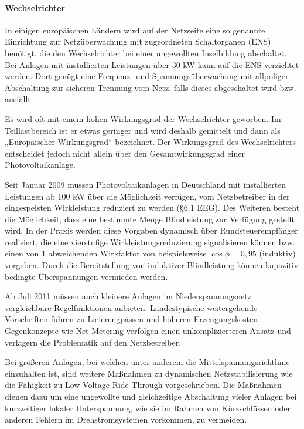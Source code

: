 \paragraph{Wechselrichter}
In einigen europäischen Ländern wird auf der Netzseite eine so genannte Einrichtung zur Netzüberwachung mit zugeordneten Schaltorganen (ENS) benötigt, die den Wechselrichter bei einer ungewollten Inselbildung abschaltet. Bei Anlagen mit installierten Leistungen über 30 \si{kW} kann auf die ENS verzichtet werden. Dort genügt eine Frequenz- und Spannungsüberwachung mit allpoliger Abschaltung zur sicheren Trennung vom Netz, falls dieses abgeschaltet wird bzw. ausfällt. 

Es wird oft mit einem hohen Wirkungsgrad der Wechselrichter geworben. Im Teillastbereich ist er etwas geringer und wird deshalb gemittelt und dann als „Europäischer Wirkungsgrad“ bezeichnet. Der Wirkungsgrad des Wechselrichters entscheidet jedoch nicht allein über den Gesamtwirkungsgrad einer Photovoltaikanlage. 

\iffalse

Seit Januar 2009 müssen Photovoltaikanlagen in Deutschland mit installierten Leistungen ab 100 \si{kW} über die Möglichkeit verfügen, vom Netzbetreiber in der eingespeisten Wirkleistung reduziert zu werden (\S 6.1 EEG). Des Weiteren besteht die Möglichkeit, dass eine bestimmte Menge Blindleistung zur Verfügung gestellt wird. In der Praxis werden diese Vorgaben dynamisch über Rundsteuerempfänger realisiert, die eine vierstufige Wirkleistungsreduzierung signalisieren können bzw. einen von 1 abweichenden Wirkfaktor von beispielsweise $\cos \phi = 0,95$ (induktiv) vorgeben. Durch die Bereitstellung von induktiver Blindleistung können kapazitiv bedingte Überspannungen vermieden werden. 

Ab Juli 2011 müssen auch kleinere Anlagen im Niederspannungsnetz vergleichbare Regelfunktionen anbieten. Landestypische weitergehende Vorschriften führen zu Lieferengpässen und höheren Erzeugungskosten. Gegenkonzepte wie Net Metering verfolgen einen unkomplizierteren Ansatz und verlagern die Problematik auf den Netzbetreiber. 

Bei größeren Anlagen, bei welchen unter anderem die Mittelspannungsrichtlinie einzuhalten ist, sind weitere Maßnahmen zu dynamischen Netzstabilisierung wie die Fähigkeit zu Low-Voltage Ride Through vorgeschrieben. Die Maßnahmen dienen dazu um eine ungewollte und gleichzeitige Abschaltung vieler Anlagen bei kurzzeitiger lokaler Unterspannung, wie sie im Rahmen von Kürzschlüssen oder anderen Fehlern im Drehstromsystemen vorkommen, zu vermeiden. 

